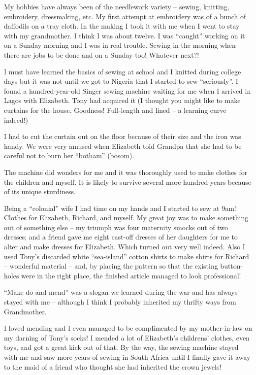 My hobbies have always been of the needlework variety -- sewing,
knitting, embroidery, dressmaking, etc. My first attempt at embroidery
was of a bunch of daffodils on a tray cloth. In the making I took it
with me when I went to stay with my grandmother. I think I was about
twelve. I was ``caught'' working on it on a Sunday morning and I was
in real trouble. Sewing in the morning when there are jobs to be done
and on a Sunday too! Whatever next?!

I must have learned the basics of sewing at school and I knitted
during college days but it was not until we got to Nigeria that I
started to sew ``seriously''. I found a hundred-year-old Singer sewing
machine waiting for me when I arrived in Lagos with Elizabeth. Tony
had acquired it (I thought you might like to make curtains for the
house. Goodness! Full-length and lined -- a learning curve indeed!)

I had to cut the curtain out on the floor because of their size and
the iron was handy. We were very amused when Elizabeth told Grandpa
that she had to be careful not to burn her ``botham'' (bosom).

The machine did wonders for me and it was thoroughly used to make
clothes for the children and myself. It is likely to survive several
more hundred years because of its unique sturdiness.

Being a ``colonial'' wife I had time on my hands and I started to sew
at 9am! Clothes for Elizabeth, Richard, and myself. My great joy was
to make something out of something else -- my triumph was four
maternity smocks out of two dresses; and a friend gave me eight
cast-off dresses of her daughters for me to alter and make dresses for
Elizabeth. Which turned out very well indeed. Also I used Tony's
discarded white ``sea-island'' cotton shirts to make shirts for
Richard -- wonderful material -- and, by placing the pattern so that
the existing button-holes were in the right place, the finished
article managed to look professional!

``Make do and mend'' was a slogan we learned during the war and has
always stayed with me -- although I think I probably inherited my
thrifty ways from Grandmother.

I loved mending and I even managed to be complimented by my
mother-in-law on my darning of Tony's socks! I mended a lot of
Elizabeth's childrens' clothes, even toys, and got a great kick out of
that. By the way, the sewing machine stayed with me and saw more years
of sewing in South Africa until I finally gave it away to the maid of
a friend who thought she had inherited the crown jewels!

